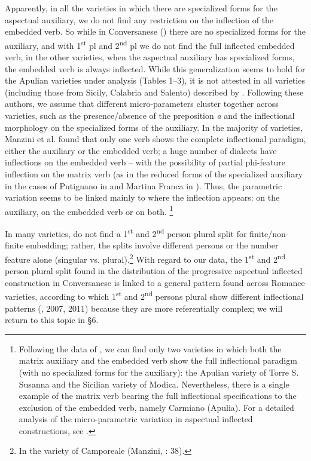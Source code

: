 \documentclass[output=paper]{langsci/langscibook}
\begin{document}
Apparently, in all the varieties in which there are specialized forms for the aspectual auxiliary, we do not find any restriction on the inflection of the embedded verb. So while in Conversanese () there are no specialized forms for the auxiliary, and with 1\textsuperscript{st} pl and 2\textsuperscript{nd} pl we do not find the full inflected embedded verb, in the other varieties, when the aspectual auxiliary has specialized forms, the embedded verb is always inflected. While this generalization seems to hold for the Apulian varieties under analysis (Tables 1–3), it is not attested in all varieties (including those from Sicily, Calabria and Salento) described by \citet{ManziniEtAl2017}. Following these authors, we assume that different micro{}-parameters cluster together across varieties, such as the presence/absence of the preposition \textit{a} and the inflectional morphology on the specialized forms of the auxiliary. In the majority of varieties, Manzini et al. found that only one verb shows the complete inflectional paradigm, either the auxiliary or the embedded verb; a huge number of dialects have inflections on the embedded verb – with the possibility of partial phi{}-feature inflection on the matrix verb (as in the reduced forms of the specialized auxiliary in the cases of Putignano in  and Martina Franca in ). Thus, the parametric variation seems to be linked mainly to where the inflection appears: on the auxiliary, on the embedded verb or on both. \footnote{Following the data of \citet{ManziniEtAl2017}, we can find only two varieties in which both the matrix auxiliary and the embedded verb show the full inflectional paradigm (with no specialized forms for the auxiliary): the Apulian variety of Torre S. Susanna and the Sicilian variety of Modica. Nevertheless, there is a single example of the matrix verb bearing the full inflectional specifications to the exclusion of the embedded verb, namely Carmiano (Apulia). For a detailed analysis of the micro-parametric variation in aspectual inflected constructions, see \citet{ManziniEtAl2017}.} 

In many varieties, \citet{ManziniEtAl2017} do not find a 1\textsuperscript{st} and 2\textsuperscript{nd} person plural split for finite/non-finite embedding; rather, the splits involve different persons or the number feature alone (singular vs. plural).\footnote{In the variety of Camporeale (Manzini, \citealt{Lorusso2017}: 38).} With regard to our data, the 1\textsuperscript{st} and 2\textsuperscript{nd} person plural split found in the distribution of the progressive aspectual inflected construction in Conversanese is linked to a general pattern found across Romance varieties, according to which 1\textsuperscript{st} and 2\textsuperscript{nd} persons plural show different inflectional patterns (\citealt{Manzini2005}, 2007, 2011) because they are more referentially complex; we will return to this topic in §6. 
\end{document}

